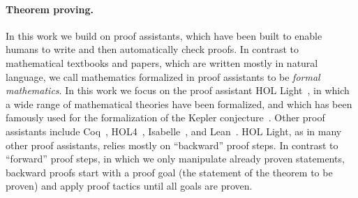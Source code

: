 \documentclass{article}
\begin{document}
\paragraph{Theorem proving.}
In this work we build on proof assistants, which have been built to enable humans to write and then automatically check proofs.
In contrast to mathematical textbooks and papers, which are written mostly in natural language, we call mathematics formalized in proof assistants to be \emph{formal mathematics}.
In this work we focus on the proof assistant HOL Light~\citep{Harrison96}, in which a wide range of mathematical theories have been formalized, and which has been famously used for the formalization of the Kepler conjecture~\citep{hales2017formal}.
Other proof assistants include Coq~\citep{coq}, HOL4~\citep{slind2008brief}, Isabelle~\citep{wenzel08isabelle}, and Lean~\citep{de2015lean}.
HOL Light, as in many other proof assistants, relies mostly on ``backward'' proof steps.
In contrast to ``forward'' proof steps, in which we only manipulate already proven statements, backward proofs start with a proof goal (the statement of the theorem to be proven) and apply proof tactics until all goals are proven.
\end{document}

